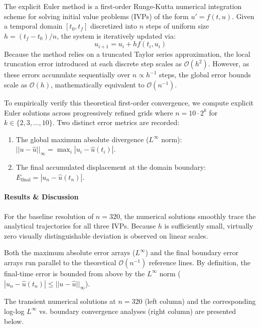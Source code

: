\begin{solution}

	The explicit Euler method is a first-order Runge-Kutta numerical integration
	scheme for solving initial value problems (IVPs) of the form $u' = f(t, u)$.
	Given a temporal domain $[t_0, t_f]$ discretized into $n$ steps of uniform size
	$h = (t_f - t_0)/n$, the system is iteratively updated via:
	\[
		u_{i+1} = u_i + h f(t_i, u_i)
	\]
	Because the method relies on a truncated Taylor series approximation, the
	local truncation error introduced at each discrete step scales as
	$\mathcal{O}(h^2)$. However, as these errors accumulate sequentially over $n
		\propto h^{-1}$ steps, the global error bounds scale as $\mathcal{O}(h)$,
	mathematically equivalent to $\mathcal{O}(n^{-1})$.

	To empirically verify this theoretical first-order convergence, we compute
	explicit Euler solutions across progressively refined grids where $n = 10 \cdot
		2^k$ for $k \in \{2, 3, \dots, 10\}$. Two distinct error metrics are recorded:
	\begin{enumerate}
		\item The global maximum absolute divergence ($L^\infty$ norm):
		      $||u-\hat{u}||_\infty = \max_{i} |u_i-\hat{u}(t_i)|$.
		\item The final accumulated displacement at the domain boundary:
		      $E_{\text{final}} = |u_n-\hat{u}(t_n)|$.
	\end{enumerate}

	\paragraph{Results \& Discussion}
	For the baseline resolution of $n=320$, the numerical solutions smoothly
	trace the analytical trajectories for all three IVPs. Because $h$ is
	sufficiently small, virtually zero visually distinguishable deviation is
	observed on linear scales.

	Both the maximum absolute error arrays ($L^\infty$) and the final boundary
	error arrays run parallel to the theoretical $\mathcal{O}(n^{-1})$ reference
	lines. By definition, the final-time error is bounded from above by the
	$L^\infty$ norm ($|u_n - \hat{u}(t_n)| \leq ||u-\hat{u}||_\infty$).

	The transient numerical solutions at $n=320$ (left column) and the
	corresponding log-log $L^\infty$ vs. boundary convergence analyses (right
	column) are presented below.


\end{solution}
